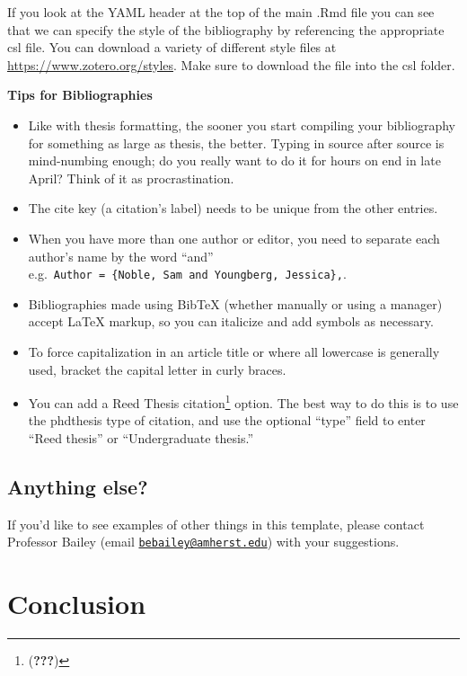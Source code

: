 \documentclass[12pt, twoside]{amherstthesis}
\providecommand{\tightlist}{%
  \setlength{\itemsep}{0pt}\setlength{\parskip}{0pt}}
\begin{document}
If you look at the YAML header at the top of the main .Rmd file you can see that we can specify the style of the bibliography by referencing the appropriate csl file. You can download a variety of different style files at \url{https://www.zotero.org/styles}. Make sure to download the file into the csl folder.

\textbf{Tips for Bibliographies}
\begin{itemize}
\tightlist
\item
  Like with thesis formatting, the sooner you start compiling your bibliography for something as large as thesis, the better. Typing in source after source is mind-numbing enough; do you really want to do it for hours on end in late April? Think of it as procrastination.
\item
  The cite key (a citation's label) needs to be unique from the other entries.
\item
  When you have more than one author or editor, you need to separate each author's name by the word ``and'' e.g.~\texttt{Author\ =\ \{Noble,\ Sam\ and\ Youngberg,\ Jessica\},}.
\item
  Bibliographies made using BibTeX (whether manually or using a manager) accept LaTeX markup, so you can italicize and add symbols as necessary.
\item
  To force capitalization in an article title or where all lowercase is generally used, bracket the capital letter in curly braces.
\item
  You can add a Reed Thesis citation\footnote{({\textbf{???}})} option. The best way to do this is to use the phdthesis type of citation, and use the optional ``type'' field to enter ``Reed thesis'' or ``Undergraduate thesis.''
\end{itemize}
\hypertarget{anything-else}{%
\section{Anything else?}\label{anything-else}}

If you'd like to see examples of other things in this template, please contact Professor Bailey (email \href{mailto:bebailey@amherst.edu}{\nolinkurl{bebailey@amherst.edu}}) with your suggestions.

\hypertarget{conclusion-1}{%
\chapter*{Conclusion}\label{conclusion-1}}
\end{document}
